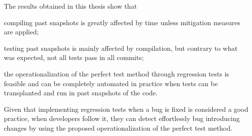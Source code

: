 The results obtained in this thesis show that  
\renewcommand{\labelenumi}{\alph{enumi})}
\begin{inparaenum}
    \item compiling past snapshots is greatly affected by time unless mitigation measures are applied;
    \item testing past snapshots is mainly affected by compilation, but contrary to what was expected, not all tests pass in all commits;
    \item the operationalization of the perfect test method through regression tests is feasible and can be completely automated in practice when tests can be transplanted and run in past snapshots of the code.
\end{inparaenum}
Given that implementing regression tests when a bug is fixed is considered a good practice, when developers follow it, they can detect effortlessly bug introducing changes by using the proposed operationalization of the perfect test method.



